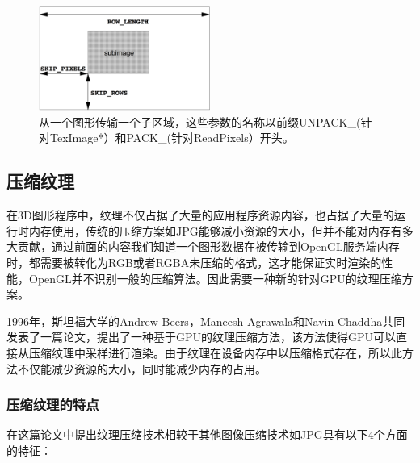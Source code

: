 \begin{figure}
\sidecaption
	\includegraphics[width=0.5\textwidth]{figures/api/PixelStore}
	\caption{从一个图形传输一个子区域，这些参数的名称以前缀UNPACK\_(针对TexImage*）和PACK\_(针对ReadPixels）开头。}
	\label{f:api-pixel-store}
\end{figure}






\subsection{压缩纹理}\label{sec:api-compressed-texture}
在3D图形程序中，纹理不仅占据了大量的应用程序资源内容，也占据了大量的运行时内存使用，传统的压缩方案如JPG能够减小资源的大小，但并不能对内存有多大贡献，通过前面的内容我们知道一个图形数据在被传输到OpenGL服务端内存时，都需要被转化为RGB或者RGBA未压缩的格式，这才能保证实时渲染的性能，OpenGL并不识别一般的压缩算法。因此需要一种新的针对GPU的纹理压缩方案。

1996年，斯坦福大学的Andrew Beers，Maneesh Agrawala和Navin Chaddha共同发表了一篇论文\cite{a:RenderingfromCompressedTextures}，提出了一种基于GPU的纹理压缩方法，该方法使得GPU可以直接从压缩纹理中采样进行渲染。由于纹理在设备内存中以压缩格式存在，所以此方法不仅能减少资源的大小，同时能减少内存的占用。

\subsubsection{压缩纹理的特点}
在这篇论文中提出纹理压缩技术相较于其他图像压缩技术如JPG具有以下4个方面的特征：

